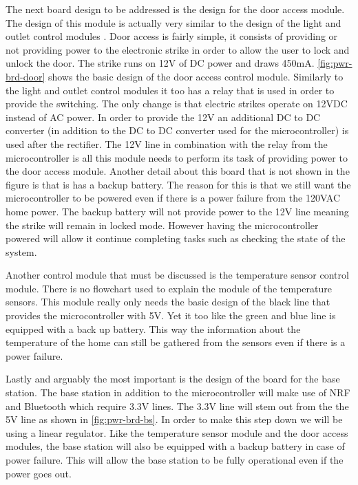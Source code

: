 The next board design to be addressed is the design for the door
access module. The design of this module is actually very similar to the
design of the light and outlet control modules . Door access is fairly
simple, it consists of providing or not providing power to the electronic
strike in order to allow the user to lock and unlock the door. The strike
runs on 12V of DC power and draws 450mA. \autoref{fig:pwr-brd-door} shows the
basic design of the door access control module. Similarly to the light and
outlet control modules it too has a relay that is used in order to provide
the switching. The only change is that electric strikes operate on 12VDC
instead of AC power. In order to provide the 12V an additional DC to DC
converter (in addition to the DC to DC converter used for the
microcontroller) is used after the rectifier. The 12V line in combination
with the relay from the microcontroller is all this module needs to perform
its task of providing power to the door access module. Another detail about
this board that is not shown in the figure is that is has a backup battery.
The reason for this is that we still want the microcontroller to be powered
even if there is a power failure from the 120VAC home power. The backup
battery will not provide power to the 12V line meaning the strike will remain
in locked mode. However having the microcontroller powered will allow it
continue completing tasks such as checking the state of the system.


Another control module that must be discussed is the temperature
sensor control module. There is no flowchart used to explain the module of
the temperature sensors. This module really only needs the basic design of
the black line that provides the microcontroller with 5V. Yet it too like the
green and blue line is equipped with a back up battery. This way the
information about the temperature of the home can still be gathered from the
sensors even if there is a power failure.

Lastly and arguably the most important is the design of the
board for the base station. The base station in addition to the
microcontroller will make use of NRF and Bluetooth which require 3.3V lines.
The 3.3V line will stem out from the the 5V line as shown in
\autoref{fig:pwr-brd-bs}. In order to make this step down we will be
using a linear regulator.  Like the temperature sensor module and the door
access modules, the base station will also be equipped with a backup battery in
case of power failure. This will allow the base station to be fully operational
even if the power goes out.

